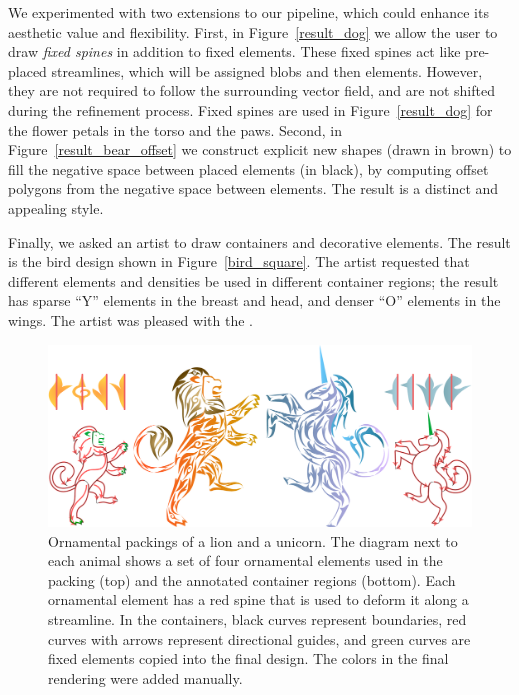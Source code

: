 We experimented with two extensions to our pipeline, 
which could enhance its aesthetic value and flexibility.
First, in Figure~\ref{result_dog} we allow the user to draw 
\textit{fixed spines} in addition to fixed elements.  These fixed
spines act like pre-placed streamlines, which will be assigned blobs
and then elements.  However, they are not required to follow the
surrounding vector field, and are not shifted during the refinement
process.  Fixed spines are used in Figure~\ref{result_dog} for the 
flower petals in the torso and the paws.
Second, in Figure~\ref{result_bear_offset} we construct explicit new shapes
(drawn in brown)
to fill the negative space between placed elements (in black), 
by computing offset polygons from the negative space between elements. 
The result is a distinct and appealing style.  

Finally, we asked an artist to draw containers and decorative elements.
The result is the bird design shown in Figure~\ref{bird_square}.
The artist requested that different elements and densities be used in 
different container regions; the result has sparse ``Y'' elements in 
the breast and head, and denser ``O'' elements in the wings. The artist was pleased with the .


\begin{figure}
\centering
\includegraphics[width=1.0\textwidth]{figures/flowpak/lion_unicorn.pdf} 
\caption[Packings of lion and unicorn]
{\label{fig_lion_unicorn} 
Ornamental packings of a lion and a unicorn.
The diagram next to each animal shows a set of four ornamental
elements used in the packing (top) and the annotated
container regions (bottom).  Each ornamental element has a
red spine that is used to deform it along a streamline.  In
the containers, black curves represent boundaries, red
curves with arrows represent directional guides, and green
curves are fixed elements copied into the final design.
The colors in the final rendering were added manually. }
\end{figure}

